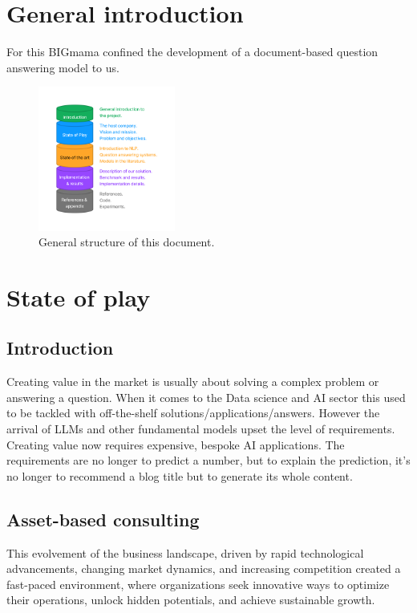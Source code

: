 \documentclass[a4paper,12pt]{article}
\begin{document}
\newpage
\printglossary[type=\acronymtype, title=List of acronyms]

\newpage

\section{General introduction}
For this BIGmama confined the development of a document-based question answering model to us.

\begin{figure}[h]
    \begin{center}
      \includegraphics[width=0.4\textwidth]{figures/plan.png}
    \end{center}
  \caption{General structure of this document.}
    \label{fig:plan}
\end{figure}

\section{State of play}
\subsection{Introduction}
Creating value in the market is usually about solving a complex problem or answering a question. When it comes to the Data science and AI sector this used to be tackled with off-the-shelf solutions/applications/answers.
However the arrival of LLMs and other fundamental models upset the level of requirements. Creating value now requires expensive,  bespoke AI applications. The requirements are no longer to predict a number, but to explain the prediction, it's no longer to recommend a blog title but to generate its whole content.   

\subsection{Asset-based consulting}
This evolvement of the business landscape, driven by rapid technological advancements, changing market dynamics, and increasing competition created a fast-paced environment, where organizations seek innovative ways to optimize their operations, unlock hidden potentials, and achieve sustainable growth. 
\end{document}
